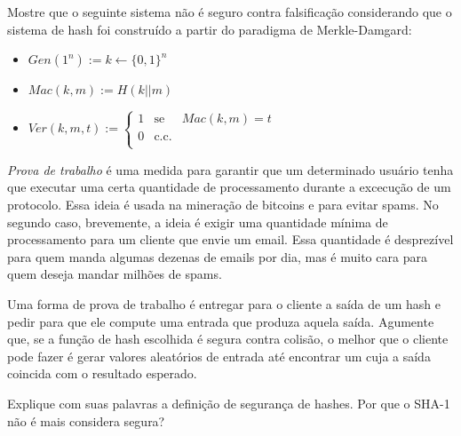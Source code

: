\begin{exercicio}
  Mostre que o seguinte sistema não é seguro contra falsificação considerando que o sistema de hash foi construído a partir do paradigma de Merkle-Damgard:
\begin{itemize}
\item $Gen(1^n) := k \leftarrow \{0,1\}^n$
\item $Mac(k,m) := H(k||m)$
\item $Ver(k,m,t) := \left\{
    \begin{array}{lcl}
      1 & \textrm{se} & Mac(k,m) = t\\
      0 & \textrm{c.c.} &\\
    \end{array}
    \right.$
\end{itemize}
\end{exercicio}

\begin{exercicio}
  {\em Prova de trabalho} é uma medida para garantir que um determinado usuário tenha que executar uma certa quantidade de processamento durante a excecução de um protocolo.
  Essa ideia é usada na mineração de bitcoins e para evitar spams.
  No segundo caso, brevemente, a ideia é exigir uma quantidade mínima de processamento para um cliente que envie um email.
  Essa quantidade é desprezível para quem manda algumas dezenas de emails por dia, mas é muito cara para quem deseja mandar milhões de spams.

  Uma forma de prova de trabalho é entregar para o cliente a saída de um hash e pedir para que ele compute uma entrada que produza aquela saída.
  Agumente que, se a função de hash escolhida é segura contra colisão, o melhor que o cliente pode fazer é gerar valores aleatórios de entrada até encontrar um cuja a saída coincida com o resultado esperado.
\end{exercicio}

\begin{exercicio}
  Explique com suas palavras a definição de segurança de hashes.
  Por que o SHA-1 não é mais considera segura?
\end{exercicio}

